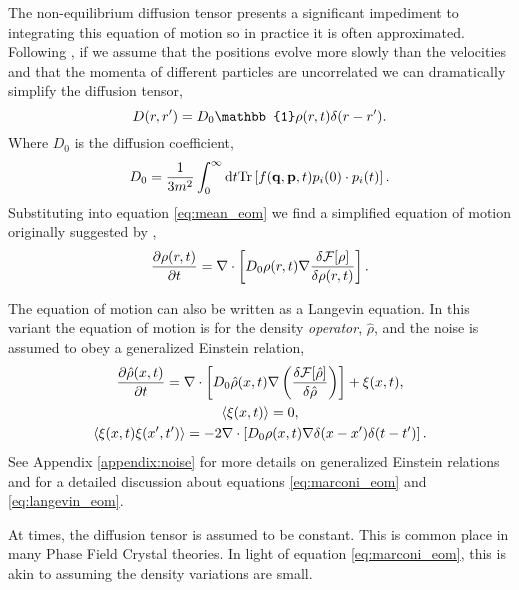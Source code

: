 The non-equilibrium diffusion tensor presents a significant impediment to
integrating this equation of motion so in practice it is often approximated.
Following \cite{ESPANOL09}, if we assume that the positions evolve more slowly
than the velocities and that the momenta of different particles are
uncorrelated we can dramatically simplify the diffusion tensor,
%
\begin{equation}
    D(r, r^\prime) = D_0\mathbb{1}\rho(r, t)\d(r - r^\prime).
\end{equation}
%
Where $D_0$ is the diffusion coefficient,
%
\begin{equation}
    D_0 = \frac{1}{3 m^2} \int_0^\infty \mathrm{d}t 
        \mathrm{Tr}\left[ f(\mathbf{q}, \mathbf{p}, t) p_i(0) \cdot p_i(t) \right].
\end{equation}
%
Substituting into equation \ref{eq:mean_eom} we find a simplified equation of
motion originally suggested by \cite{MT1999},
%
\begin{equation}
    \label{eq:marconi_eom}
    \frac{\partial \rho(r, t)}{\partial t} = 
        \nabla \cdot \left[ D_0 \rho(r, t)
        \nabla \frac{\delta \mathcal{F}[\rho]}{\delta \rho(r, t)}\right].
\end{equation}
%

The equation of motion can also be written as a Langevin equation. In this
variant the equation of motion is for the density \textit{operator},
$\hat{\rho}$, and the noise is assumed to obey a generalized Einstein relation,
%
\begin{gather}
    \label{eq:langevin_eom}
    \frac{\partial \hat{\rho}(x, t)}{\partial t} =
        \nabla \cdot \left[
            D_0 \hat{\rho}(x, t) \nabla \left(
            \frac{\delta \mathcal{F}[\hat{\rho}]}{\delta \hat{\rho}}\right)
            \right] + \xi(x, t), \\
    \left\langle \xi(x, t) \right\rangle = 0, \\
    \left\langle \xi(x, t)\xi(x^\prime, t^\prime) \right\rangle = 
        -2 \nabla \cdot \left[ D_0 \rho(x,t) 
            \nabla \delta(x - x^\prime) \delta(t - t^\prime)\right].
\end{gather}
%
See Appendix \ref{appendix:noise} for more details on generalized Einstein
relations and \cite{AR2004} for a detailed discussion about equations
\ref{eq:marconi_eom} and \ref{eq:langevin_eom}.

At times, the diffusion tensor is assumed to be constant. This is common place
in many Phase Field Crystal theories. In light of equation
\ref{eq:marconi_eom}, this is akin to assuming the density variations are
small.

